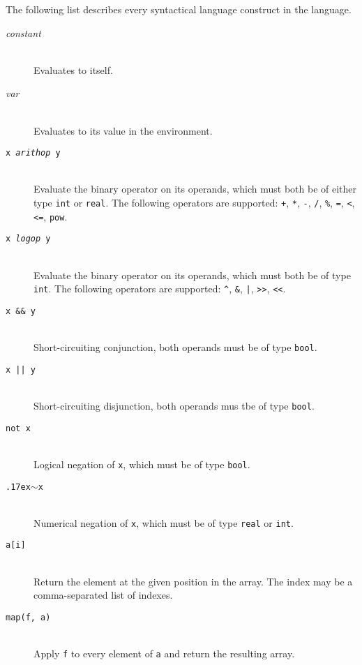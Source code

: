 \documentclass[oneside]{memoir}
\newcommand\boolt[0]{\texttt{bool}}
\newcommand\realt[0]{\texttt{real}}
\newcommand\intt[0]{\texttt{int}}
\renewcommand\tilde[0]{{\raise.17ex\hbox{$\scriptstyle\sim$}}}
\begin{document}
The following list describes every syntactical language construct in
the language.

\begin{description}
  \item[\textit{constant}]\hfill\\
    Evaluates to itself.

  \item[\textit{var}]\hfill\\
    Evaluates to its value in the environment.

  \item[\texttt{x \textit{arithop} y}] \hfill\\
    Evaluate the binary operator on its operands, which must both be
    of either type \intt{} or \realt.  The following operators are
    supported: \texttt{+}, \texttt{*}, \texttt{-}, \texttt{/},
    \texttt{\%}, \texttt{=}, \texttt{<}, \texttt{<=}, \texttt{pow}.

  \item[\texttt{x \textit{logop} y}] \hfill\\
    Evaluate the binary operator on its operands, which must both be
    of type \intt.  The following operators are supported:
    \texttt{\^}, \texttt{\&}, \texttt{|}, \texttt{>>}, \texttt{<<}.

  \item[\texttt{x \&\& y}]\hfill\\
    Short-circuiting conjunction, both operands must be of type \boolt.

  \item[\texttt{x || y}]\hfill\\
    Short-circuiting disjunction, both operands mus tbe of type \boolt.

  \item[\texttt{not x}]\hfill\\
    Logical negation of \texttt{x}, which must be of type \boolt.

  \item[\texttt{\tilde x}]\hfill\\
    Numerical negation of \texttt{x}, which must be of type \realt{} or \intt.

  \item[\texttt{a[i]}]\hfill\\
    Return the element at the given position in the array.  The index
    may be a comma-separated list of indexes.

  \item[\texttt{map(f, a)}]\hfill\\
    Apply \texttt{f} to every element of \texttt{a} and return the resulting array.


\end{description}
\end{document}
